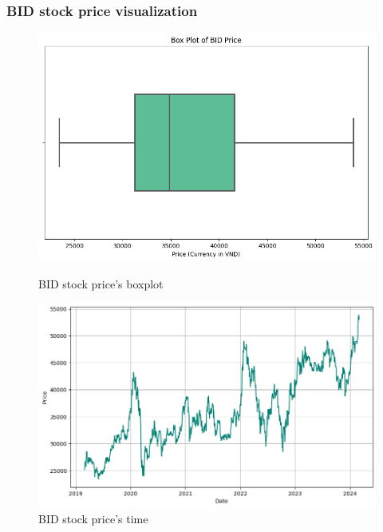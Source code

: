 \documentclass{ieeeojies}
\begin{document}
\subsubsection{BID stock price visualization}
\begin{figure}[H]
    \centering
    \begin{minipage}{0.23\textwidth}
        \centering
        \includegraphics[width=1\textwidth]{bibliography/Figure/BIDboxplot.png}
        \caption{BID stock price's boxplot}
        \label{fig:1}
    \end{minipage}
    \hfill
    \begin{minipage}{0.23\textwidth}
        \centering
        \includegraphics[width=\textwidth]{bibliography/Figure/BIDtime.png}
        \caption{BID stock price's time}
        \label{fig:2}
    \end{minipage}
    \begin{minipage}{0.23\textwidth}
        \centering

\end{minipage}
\end{figure}
\end{document}
